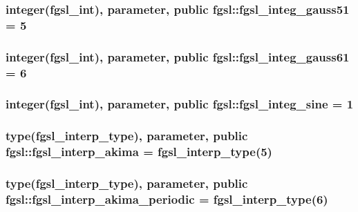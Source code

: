 \hypertarget{classfgsl_a8331538c5a42b13f0893e34864bae6d7}{
\subsubsection[{fgsl\-\_\-integ\-\_\-gauss51}]{\setlength{\rightskip}{0pt plus 5cm}integer({\bf fgsl\-\_\-int}), parameter, public fgsl\-::fgsl\-\_\-integ\-\_\-gauss51 = 5}}\label{classfgsl_a8331538c5a42b13f0893e34864bae6d7}
\hypertarget{classfgsl_ac82cf20c4bb7b1f3a6053020016abfed}{
\subsubsection[{fgsl\-\_\-integ\-\_\-gauss61}]{\setlength{\rightskip}{0pt plus 5cm}integer({\bf fgsl\-\_\-int}), parameter, public fgsl\-::fgsl\-\_\-integ\-\_\-gauss61 = 6}}\label{classfgsl_ac82cf20c4bb7b1f3a6053020016abfed}
\hypertarget{classfgsl_a4cc7312b9db6359e7b0cdc32f98ce88d}{
\subsubsection[{fgsl\-\_\-integ\-\_\-sine}]{\setlength{\rightskip}{0pt plus 5cm}integer({\bf fgsl\-\_\-int}), parameter, public fgsl\-::fgsl\-\_\-integ\-\_\-sine = 1}}\label{classfgsl_a4cc7312b9db6359e7b0cdc32f98ce88d}
\hypertarget{classfgsl_a7da81682e22860ff3f743dcf2e80b6e5}{
\subsubsection[{fgsl\-\_\-interp\-\_\-akima}]{\setlength{\rightskip}{0pt plus 5cm}type({\bf fgsl\-\_\-interp\-\_\-type}), parameter, public fgsl\-::fgsl\-\_\-interp\-\_\-akima = {\bf fgsl\-\_\-interp\-\_\-type}(5)}}\label{classfgsl_a7da81682e22860ff3f743dcf2e80b6e5}
\hypertarget{classfgsl_ae51f422b992227f64fb8505b62335502}{
\subsubsection[{fgsl\-\_\-interp\-\_\-akima\-\_\-periodic}]{\setlength{\rightskip}{0pt plus 5cm}type({\bf fgsl\-\_\-interp\-\_\-type}), parameter, public fgsl\-::fgsl\-\_\-interp\-\_\-akima\-\_\-periodic = {\bf fgsl\-\_\-interp\-\_\-type}(6)}}\label{classfgsl_ae51f422b992227f64fb8505b62335502}
